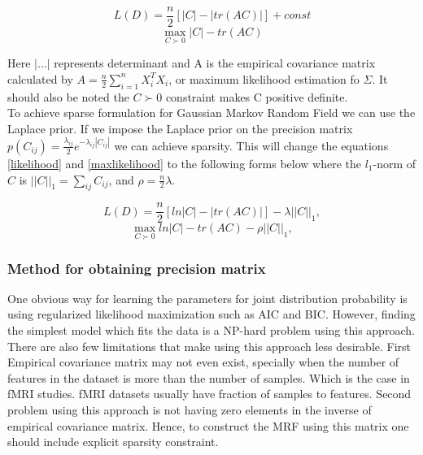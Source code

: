 \documentclass{article} %
\begin{document}
\begin{multicols}{2}
\begin{equation}\label{likelihood}
L(D) = \frac{n}{2} [|C| -  |tr(AC)|] + const
\end{equation}\break
\begin{equation}\label{maxlikelihood}
\max_{C\succ0} |C| - tr(AC)
\end{equation}
\end{multicols}

Here $|...|$ represents determinant and A is the empirical covariance 
matrix calculated by $A = \frac{n}{2} \sum_{i=1}^{n} X_i^T X_i$, or 
maximum likelihood estimation fo $\Sigma$. It should also be noted 
the $C\succ0$ constraint makes C positive definite.\\

To achieve sparse formulation for Gaussian Markov Random Field we can use 
the Laplace prior. If we impose the Laplace prior on the precision matrix 
$p(C_{ij}) = \frac{\lambda_{ij}}{2} e^{-\lambda_{ij}|C_{ij}|} $ we can 
achieve sparsity. This will change the equations \eqref{likelihood} and 
\eqref{maxlikelihood} to the following forms below where the $l_{1}$-norm 
of $C$ is $||C||_{1}= \sum_{ij}C_{ij}$, and $\rho=\frac{n}{2}\lambda$.

\begin{multicols}{2}
\begin{equation}\label{loglikelihood}
L(D) = \frac{n}{2} [ln|C| -  |tr(AC)|] - \lambda||C||_{1}, 
\end{equation}\break
\begin{equation}\label{logmaxlikelihood}
\max_{C\succ0} ln|C| - tr(AC) - \rho||C||_{1},
\end{equation}
\end{multicols}



\subsubsection{Method for obtaining precision matrix}  
One obvious way for learning the parameters for joint distribution probability 
is using regularized likelihood maximization such as AIC and BIC. However, 
finding the simplest model which fits the data is a NP-hard problem using this 
approach. There are also few limitations that make using this approach less 
desirable. First Empirical covariance matrix may not even exist, specially when 
the number of features in the dataset is more than the number of samples. Which 
is the case in fMRI studies. fMRI datasets usually have fraction of samples to 
features. Second problem using this approach is not having zero elements in the 
inverse of empirical covariance matrix. Hence, to construct the MRF using this 
matrix one should include explicit sparsity constraint.\cite{Rish2014Book} \\
\end{document}
